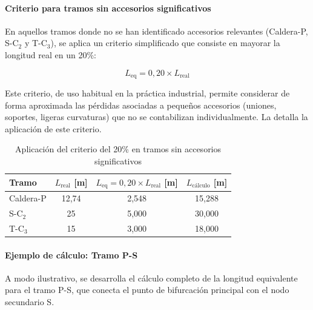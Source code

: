 \paragraph{Criterio para tramos sin accesorios significativos}

En aquellos tramos donde no se han identificado accesorios relevantes (Caldera-P, S-C$_2$ y T-C$_3$), se aplica un criterio simplificado que consiste en mayorar la longitud real en un 20\%:

\begin{equation}
	L_{\text{eq}} = 0{,}20 \times L_{\text{real}}
	\label{eq:criterio-20-porciento}
\end{equation}

Este criterio, de uso habitual en la práctica industrial, permite considerar de forma aproximada las pérdidas asociadas a pequeños accesorios (uniones, soportes, ligeras curvaturas) que no se contabilizan individualmente. La  detalla la aplicación de este criterio.

\begin{table}[H]
	\centering
	\caption{Aplicación del criterio del 20\% en tramos sin accesorios significativos}
	\label{tab:tramos-criterio-20}
	\begin{tabular}{lccc}
		\toprule
		\textbf{Tramo} & \textbf{$L_{\text{real}}$ [m]} & \textbf{$L_{\text{eq}} = 0{,}20 \times L_{\text{real}}$ [m]} & \textbf{$L_{\text{cálculo}}$ [m]} \\
			\midrule
		Caldera-P      & 12,74                          & 2,548                                                        & 15,288                            \\
		S-C$_2$        & 25                             & 5,000                                                        & 30,000                            \\
		T-C$_3$        & 15                             & 3,000                                                        & 18,000                            \\
		\bottomrule
	\end{tabular}
\end{table}

\paragraph{Ejemplo de cálculo: Tramo P-S}

A modo ilustrativo, se desarrolla el cálculo completo de la longitud equivalente para el tramo P-S, que conecta el punto de bifurcación principal con el nodo secundario S.

